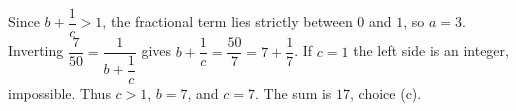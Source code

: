 Since $b+\dfrac{1}{c}>1$, the fractional term lies strictly between $0$ and $1$, so $a=3$. Inverting $\dfrac{7}{50}=\dfrac{1}{b+\dfrac{1}{c}}$ gives $b+\dfrac{1}{c}=\dfrac{50}{7}=7+\dfrac{1}{7}$. If $c=1$ the left side is an integer, impossible. Thus $c>1$, $b=7$, and $c=7$. The sum is $\boxed{17}$, choice (c).
